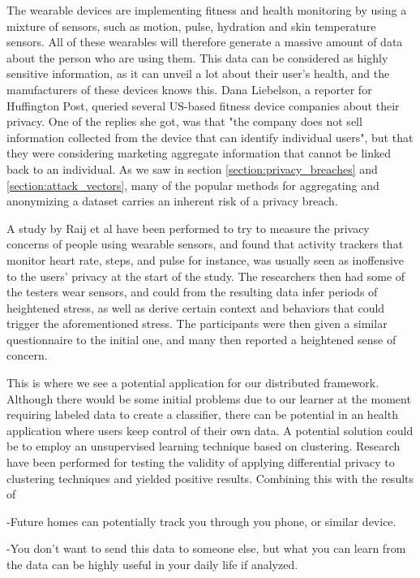 The wearable devices are implementing fitness and health monitoring by using a mixture of sensors, such as motion, pulse, hydration and skin temperature sensors. All of these wearables will therefore generate a massive amount of data about the person who are using them. This data can be considered as highly sensitive information, as it can unveil a lot about their user's health, and the manufacturers of these devices knows this. Dana Liebelson, a reporter for Huffington Post, queried several US-based fitness device companies about their privacy. One of the replies she got, was that "the company does not sell information collected from the device that can identify individual users", but that they were considering marketing aggregate information that cannot be linked back to an individual. As we saw in section \ref{section:privacy_breaches} and \ref{section:attack_vectors}, many of the popular methods for aggregating and anonymizing a dataset carries an inherent risk of a privacy breach.

A study by Raij et al\cite{raij2011privacyConcernWearables} have been performed to try to measure the privacy concerns of people using wearable sensors, and found that activity trackers that monitor heart rate, steps, and pulse for instance, was usually seen as inoffensive to the users’ privacy at the start of the study. The researchers then had some of the testers wear sensors, and could from the resulting data infer periods of heightened stress, as well as derive certain context and behaviors that could trigger the aforementioned stress. The participants were then given a similar questionnaire to the initial one, and many then reported a heightened sense of concern. 
  
This is where we see a potential application for our distributed framework. Although there would be some initial problems due to our learner at the moment requiring labeled data to create a classifier, there can be potential in an health application where users keep control of their own data. A potential solution could be to employ an unsupervised learning technique based on clustering. Research have been performed for testing the validity of applying differential privacy to clustering techniques and yielded positive results. Combining this with the results of   

-Future homes can potentially track you through you phone, or similar device. 

-You don't want to send this data to someone else, but what you can learn from the data can be highly useful in your daily life if analyzed. 

